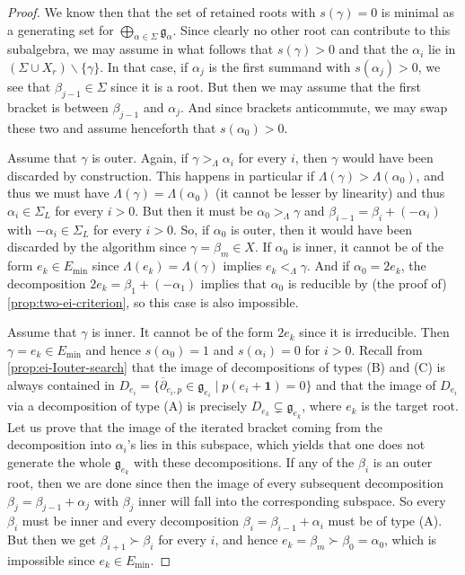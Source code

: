 \documentclass[11pt,letterpaper,reqno]{amsart}
\theoremstyle{remark}
\theoremstyle{definition}
\begin{document}
\begin{proof}
We know then that the set of retained roots with $s(\gamma)=0$ is minimal as a generating set for $\bigoplus_{\alpha\in\Sigma} \mathfrak g_\alpha$. Since clearly no other root can contribute to this subalgebra, we may assume in what follows that $s(\gamma)>0$ and that the $\alpha_i$ lie in $(\Sigma\cup X_r)\smallsetminus\{\gamma\}$. In that case, if $\alpha_j$ is the first summand with $s(\alpha_j)>0$, we see that $\beta_{j-1}\in\Sigma$ since it is a root. But then we may assume that the first bracket is between $\beta_{j-1}$ and $\alpha_j$. And since brackets anticommute, we may swap these two and assume henceforth that $s(\alpha_0)>0$.

Assume that $\gamma$ is outer. Again, if $\gamma>_\Lambda\alpha_i$ for every $i$, then $\gamma$ would have been discarded by construction. This happens in particular if $\Lambda(\gamma)>\Lambda(\alpha_0)$, and thus we must have $\Lambda(\gamma)=\Lambda(\alpha_0)$ (it cannot be lesser by linearity) and thus $\alpha_i\in\Sigma_L$ for every $i>0$.  But then it must be $\alpha_0>_\Lambda\gamma$ and $\beta_{i-1}=\beta_i+(-\alpha_i)$ with $-\alpha_i\in\Sigma_L$ for every $i>0$. So, if $\alpha_0$ is outer, then it would have been discarded by the algorithm since $\gamma=\beta_m\in X$. If $\alpha_0$ is inner, it cannot be of the form $e_k\in E_\mathrm{min}$ since $\Lambda(e_k)=\Lambda(\gamma)$ implies $e_k<_\Lambda\gamma$. And if $\alpha_0=2e_k$, the decomposition $2e_k=\beta_1+(-\alpha_1)$ implies that $\alpha_0$ is reducible by (the proof of) \cref{prop:two-ei-criterion}, so this case is also impossible.

Assume that $\gamma$ is inner. It cannot be of the form $2e_k$ since it is irreducible. Then $\gamma=e_k\in E_{\mathrm{min}}$ and hence $s(\alpha_0)=1$ and $s(\alpha_i)=0$ for $i>0$. Recall from \cref{prop:ei-Iouter-search} that the image of decompositions of types \textup{(B)} and \textup{(C)} is always contained in $D_{e_i}=\{\overline\partial_{e_i,p}\in\mathfrak g_{e_i}\mid p(e_i+\mathbf{1})=0\}$ and that the image of $D_{e_i}$ via a decomposition of type \textup{(A)} is precisely $D_{e_k}\subsetneq \mathfrak g_{e_k}$, where $e_k$ is the target root. Let us prove that the image of the iterated bracket coming from the decomposition into $\alpha_i$'s lies in this subspace, which yields that one does not generate the whole $\mathfrak g_{e_k}$ with these decompositions. If any of the $\beta_i$ is an outer root, then we are done since then the image of every subsequent decomposition $\beta_j=\beta_{j-1}+\alpha_j$ with $\beta_j$ inner will fall into the corresponding subspace. So every $\beta_i$ must be inner and every decomposition $\beta_{i}=\beta_{i-1}+\alpha_i$ must be of type \textup{(A)}. But then we get $\beta_{i+1}\succ\beta_i$ for every $i$, and hence $e_k=\beta_m\succ \beta_0=\alpha_0$, which is impossible since $e_k\in E_{\mathrm{min}}$.



\end{proof}
\end{document}
